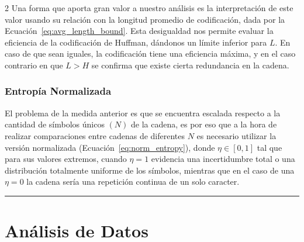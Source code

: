 \documentclass[a4paper, 10pt]{article}
\newcommand{\sectionrule}{\noindent\color{black!30}\rule{\linewidth}{0.6pt}}
\begin{document}
\begin{multicols}{2}
            Una forma que aporta gran valor a nuestro análisis es la interpretación de este valor usando su relación con la longitud promedio de codificación, dada por la Ecuación~\eqref{eq:avg_length_bound}. Esta desigualdad nos permite evaluar la eficiencia de la codificación de Huffman, dándonos un límite inferior para $L$. En caso de que sean iguales, la codificación tiene una eficiencia máxima, y en el caso contrario en que $L>H$ se confirma que existe cierta redundancia en la cadena.

        \subsubsection*{Entropía Normalizada}

           El problema de la medida anterior es que se encuentra escalada respecto a la cantidad de símbolos únicos $(N)$ de la cadena, es por eso que a la hora de realizar comparaciones entre cadenas de diferentes $N$ es necesario utilizar la versión normalizada (Ecuación~\eqref{eq:norm_entropy}), donde $\eta \in [0,1]$ tal que para sus valores extremos, cuando $\eta=1$ evidencia una incertidumbre total o una distribución totalmente uniforme de los símbolos, mientras que en el caso de una $\eta=0$ la cadena sería una repetición continua de un solo caracter.
    
    \end{multicols}

{\sectionrule}


\section{Análisis de Datos}\label{sec:analisis}
\end{document}
